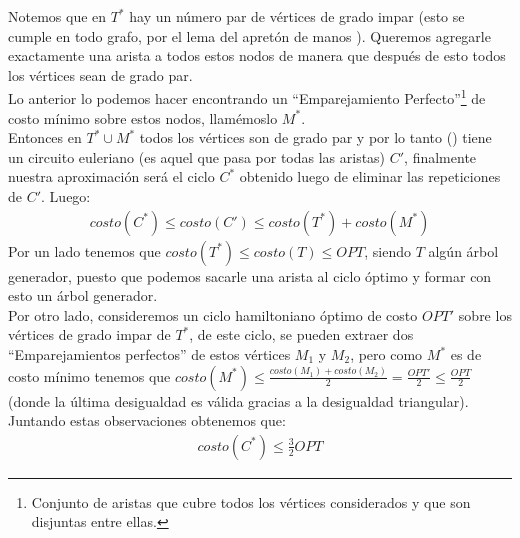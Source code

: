 \documentclass[dcc,uchile]{fcfmcourse}
\begin{document}
\begin{problems}
Notemos que en $T^*$ hay un número par de vértices de grado impar (esto se cumple en todo grafo, por el lema del apretón de manos \nerd). Queremos agregarle exactamente una arista a todos estos nodos de manera que después de esto todos los vértices sean de grado par. \\
Lo anterior lo podemos hacer encontrando un ``Emparejamiento Perfecto''\footnote{Conjunto de aristas que cubre todos los vértices considerados y que son disjuntas entre ellas.} de costo mínimo sobre estos nodos, llamémoslo $M^*$.\\

Entonces en $T^*\cup M^*$ todos los vértices son de grado par y por lo tanto (\nerd) tiene un circuito euleriano (es aquel que pasa por todas las aristas) $C'$, finalmente nuestra aproximación será el ciclo $C^*$ obtenido luego de eliminar las repeticiones de $C'$. Luego:
\begin{align*}
    costo(C^*) \le costo(C') \le costo(T^*) + costo(M^*)
\end{align*}
Por un lado tenemos que $costo(T^*) \le costo(T) \le OPT$, siendo $T$ algún árbol generador, puesto que podemos sacarle una arista al ciclo óptimo y formar con esto un árbol generador.\\

Por otro lado, consideremos un ciclo hamiltoniano óptimo de costo $OPT'$ sobre los vértices de grado impar de $T^*$, de este ciclo, se pueden extraer dos ``Emparejamientos perfectos'' de estos vértices $M_{1}$ y $M_{2}$, pero como $M^*$ es de costo mínimo tenemos que $costo(M^*) \le \frac{costo(M_{1})+ costo(M_{2})}{2} = \frac{OPT'}{2} \le \frac{OPT}{2}$ (donde la última desigualdad es válida gracias a la desigualdad triangular).\\

Juntando estas observaciones obtenemos que:
\begin{align*}
    costo(C^*) \le \frac{3}{2}OPT
\end{align*}
\end{problems}
\end{document}
